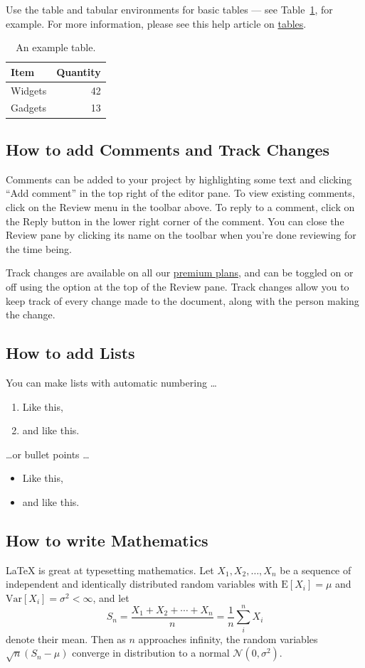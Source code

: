 \documentclass{article}
\begin{document}
Use the table and tabular environments for basic tables --- see Table~\ref{tab:widgets}, for example. For more information, please see this help article on \href{https://www.overleaf.com/learn/latex/tables}{tables}.

\begin{table}
\centering
\begin{tabular}{l|r}
Item & Quantity \\\hline
Widgets & 42 \\
Gadgets & 13
\end{tabular}
\caption{\label{tab:widgets}An example table.}
\end{table}


\subsection{How to add Comments and Track Changes}

Comments can be added to your project by highlighting some text and clicking ``Add comment'' in the top right of the editor pane. To view existing comments, click on the Review menu in the toolbar above. To reply to a comment, click on the Reply button in the lower right corner of the comment. You can close the Review pane by clicking its name on the toolbar when you're done reviewing for the time being.

Track changes are available on all our \href{https://www.overleaf.com/user/subscription/plans}{premium plans}, and can be toggled on or off using the option at the top of the Review pane. Track changes allow you to keep track of every change made to the document, along with the person making the change.


\subsection{How to add Lists}

You can make lists with automatic numbering \dots

\begin{enumerate}
\item Like this,
\item and like this.
\end{enumerate}
\dots or bullet points \dots
\begin{itemize}
\item Like this,
\item and like this.
\end{itemize}

\subsection{How to write Mathematics}

\LaTeX{} is great at typesetting mathematics. Let $X_1, X_2, \ldots, X_n$ be a sequence of independent and identically distributed random variables with $\text{E}[X_i] = \mu$ and $\text{Var}[X_i] = \sigma^2 < \infty$, and let
\[S_n = \frac{X_1 + X_2 + \cdots + X_n}{n}
  = \frac{1}{n}\sum_{i}^{n} X_i\]
denote their mean. Then as $n$ approaches infinity, the random variables $\sqrt{n}(S_n - \mu)$ converge in distribution to a normal $\mathcal{N}(0, \sigma^2)$.
\end{document}
